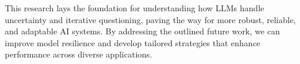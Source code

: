 This research lays the foundation for understanding how LLMs handle uncertainty and iterative questioning, paving the way for more robust, reliable, and adaptable AI systems. By addressing the outlined future work, we can improve model resilience and develop tailored strategies that enhance performance across diverse applications.

